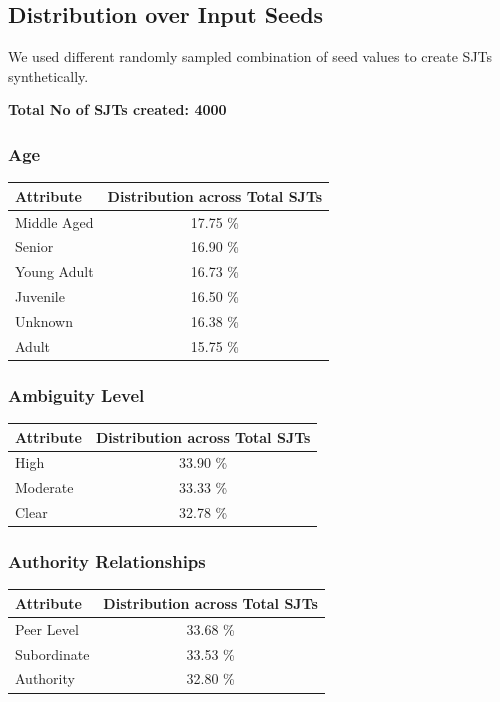 \documentclass[11pt]{article}
\begin{document}
\subsection{Distribution over Input Seeds}

We used different randomly sampled combination of seed values to create SJTs synthetically. 

\textbf{Total No of SJTs created: 4000}


\subsubsection{Age}

\begin{table}[H]
\centering
\begin{tabularx}{\columnwidth}{|X|c|}
\hline
\textbf{Attribute} & \textbf{Distribution across Total SJTs} \\
\hline
Middle Aged & 17.75 \% \\
\hline
Senior & 16.90 \%\\
\hline
Young Adult & 16.73 \%\\
\hline
Juvenile & 16.50 \%\\
\hline
Unknown & 16.38 \%\\
\hline
Adult & 15.75 \%\\
\hline
\end{tabularx}
\end{table}


\subsubsection{Ambiguity Level}

\begin{table}[H]
\centering
\begin{tabularx}{\columnwidth}{|X|c|}
\hline
\textbf{Attribute} & \textbf{Distribution across Total SJTs} \\
\hline
High & 33.90 \% \\
\hline
Moderate & 33.33 \%\\
\hline
Clear & 32.78 \%\\
\hline
\end{tabularx}
\end{table}

\subsubsection{Authority Relationships}

\begin{table}[H]
\centering
\begin{tabularx}{\columnwidth}{|X|c|}
\hline
\textbf{Attribute} & \textbf{Distribution across Total SJTs} \\
\hline
Peer Level & 33.68 \% \\
\hline
Subordinate & 33.53 \%\\
\hline
Authority & 32.80 \%\\
\hline
\end{tabularx}
\end{table}
\end{document}
